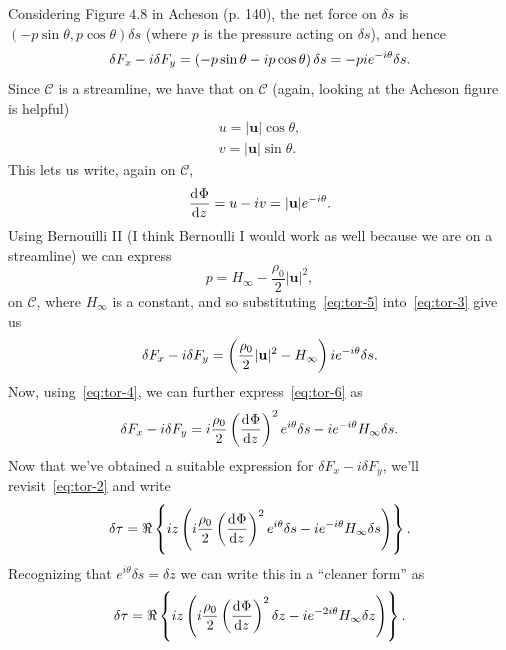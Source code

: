 \documentclass{article}
\def\*#1{\mathbf{#1}}
\newcommand{\fC}{\mathcal{C}} %
\newcommand{\dF}{\delta F}
\newcommand{\ds}{\delta s}
\newcommand{\dz}{\delta z}
\newcommand{\dtau}{\delta \tau}
\begin{document}
Considering Figure $4.8$ in Acheson (p. 140), the net force on $\ds$ is
$(-p \sin \theta, p \cos \theta) \ds$ (where $p$ is the pressure acting
on $\ds$), and hence
%
\begin{equation}
    \dF_x - i \dF_y
        = \del{-p \sin \theta - i p \cos \theta} \ds = -p i e^{-i \theta} \ds
    \label{eq:tor-3}
    .
\end{equation}
%
Since $\fC$ is a streamline, we have that on $\fC$ (again, looking at the
Acheson figure is helpful)
%
\begin{align*}
    u = |\*u| \cos \theta, \\
    v = |\*u| \sin \theta.
\end{align*}
%
This lets us write, again on $\fC$,
%
\begin{equation}
    \dod{\Phi}{z} = u - i v = |\*u| e^{-i \theta}
    \label{eq:tor-4}
    .
\end{equation}
%
Using Bernouilli II (I think Bernoulli I would work as well because we
are on a streamline) we can express
%
\begin{equation}
    p = H_\infty - \frac{\rho_0}{2} |\*u|^2
    \label{eq:tor-5}
    ,
\end{equation}
%
on $\fC$, where $H_\infty$ is a constant, and so
substituting~\eqref{eq:tor-5} into~\eqref{eq:tor-3} give us
%
\begin{equation}
    \dF_x - i \dF_y
        = \del{\frac{\rho_0}{2} |\*u|^2 - H_\infty} i e^{-i \theta} \ds
    \label{eq:tor-6}
        .
\end{equation}
%
Now, using~\eqref{eq:tor-4}, we can further express~\eqref{eq:tor-6} as
%
\begin{equation}
    \dF_x - i \dF_y
        = i \frac{\rho_0}{2} \del{\dod{\Phi}{z}}^2 e^{i \theta} \ds - i e^{- i \theta} H_\infty \ds
    \label{eq:tor-7}
        .
\end{equation}
%
Now that we've obtained a suitable expression for $\dF_x - i \dF_y$,
we'll revisit~\eqref{eq:tor-2} and write
%
\begin{equation*}
    \dtau = \Re \cbr{
        i z \del{i \frac{\rho_0}{2} \del{\dod{\Phi}{z}}^2 e^{i \theta} \ds
        - i e^{- i \theta} H_\infty \ds}
    }
    .
\end{equation*}
%
Recognizing that $e^{i \theta} \ds = \dz$ we can write this in a ``cleaner form'' as
%
\begin{equation*}
    \dtau = \Re \cbr{
        i z \del{i \frac{\rho_0}{2} \del{\dod{\Phi}{z}}^2 \dz
        - i e^{- 2 i \theta} H_\infty \dz}
    }
    .
\end{equation*}
\end{document}
